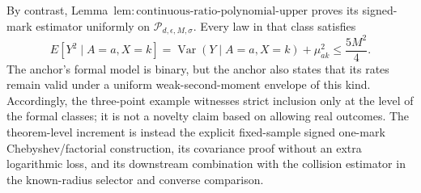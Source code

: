By contrast, Lemma~\(\mathrm{lem:continuous\text{-}ratio\text{-}polynomial\text{-}upper}\) proves its signed-mark estimator uniformly on \(\mathcal P_{d,\epsilon,M,\sigma}\).  Every law in that class satisfies
\[
 E[Y^2\mid A=a,X=k]
 =\operatorname{Var}(Y\mid A=a,X=k)+\mu_{ak}^2
 \le\frac{5M^2}{4}.
\tag{8}
\]
The anchor's formal model is binary, but the anchor also states that its rates remain valid under a uniform weak-second-moment envelope of this kind.  Accordingly, the three-point example witnesses strict inclusion only at the level of the formal classes; it is not a novelty claim based on allowing real outcomes.  The theorem-level increment is instead the explicit fixed-sample signed one-mark Chebyshev/factorial construction, its covariance proof without an extra logarithmic loss, and its downstream combination with the collision estimator in the known-radius selector and converse comparison.